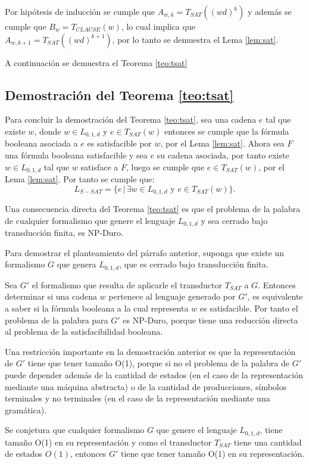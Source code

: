 \documentclass[12pt]{article}
\begin{document}
Por hipótesis de inducción se cumple que $A_{w,k}=T_{SAT}((wd)^{k})$ y además se cumple que $B_w=T_{CLAUSE}(w)$, lo cual implica que $A_{w,k+1}=T_{SAT}((wd)^{k+1})$, por lo tanto se demuestra el Lema \ref{lem:sat}.

A continuación se demuestra el Teorema \ref{teo:tsat}

\subsection{Demostración del Teorema \ref{teo:tsat}}

Para concluir la demostración del Teorema \ref{teo:tsat}, sea una cadena $e$ tal que existe $w$, donde $w \in L_{0,1,d}$ y $e \in T_{SAT}(w)$ entonces 
se cumple que la fórmula booleana asociada a $e$ es satisfacible por $w$, por el Lema \ref{lem:sat}. Ahora sea $F$ una fórmula 
booleana satisfacible y sea $e$ su cadena asociada, por tanto existe $w\in L_{0,1,d}$ tal que $w$ satisface a $F$, luego se cumple que $e\in T_{SAT}(w)$, por el Lema \ref{lem:sat}. Por tanto se cumple que:
$$L_{S-SAT} = \{e\,|\,\exists w \in L_{0,1,d} \text{ y } e \in T_{SAT}(w) \}.$$

Una consecuencia directa del Teorema \ref{teo:tsat} es que el problema de la palabra de cualquier formalismo que genere el lenguaje $L_{0,1,d}$ y sea cerrado bajo transducción finita, es NP-Duro.

Para demostrar el planteamiento del párrafo anterior, suponga que existe un formalismo $G$ que genera $L_{0,1,d}$, 
que es cerrado bajo transducción finita. 

Sea $G'$ el formalismo que resulta de aplicarle el transductor $T_{SAT}$ a $G$. Entonces determinar si una cadena 
$w$ pertenece al lenguaje generado por $G'$, es equivalente a saber si la fórmula booleana a la cual representa 
$w$ es satisfacible. Por tanto el problema de la palabra para 
$G'$ es NP-Duro, porque tiene una reducción directa al problema de la satisfacibilidad booleana. 

Una restricción importante en la demostración anterior es que la representación de $G'$ tiene que tener tamaño O(1),
porque si no el problema de la palabra de $G'$ puede depender además de la cantidad de estados (en el caso de
la representación mediante una máquina abstracta) o de la cantidad de producciones, símbolos terminales y no terminales
(en el caso de la representación mediante una  gramática).

Se conjetura que cualquier formalismo $G$ que genere el lenguaje $L_{0,1,d}$, tiene tamaño O(1) en su representación
y como el transductor $T_{SAT}$ tiene una cantidad de estados $O(1)$, entonces $G'$ tiene que tener tamaño O(1) en su representación.
\end{document}
